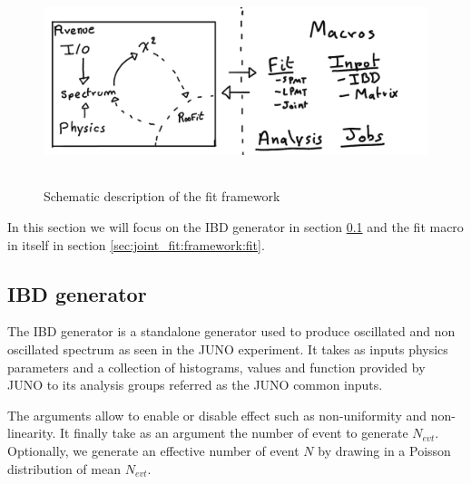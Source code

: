 \documentclass[../main.tex]{subfiles}
\begin{document}
\begin{figure}[ht]
  \centering
  \includegraphics[height=6cm]{images/joint_fit/fit_framework.png}
  \caption{Schematic description of the fit framework}
  \label{fig:joint_fit:framework}
\end{figure}

In this section we will focus on the IBD generator in section \ref{sec:joint_fit:framework:ibd-gen} and the fit macro in itself in section \ref{sec:joint_fit:framework:fit}.
%
%
%
%
\subsection{IBD generator}
\label{sec:joint_fit:framework:ibd-gen}

The IBD generator is a standalone generator used to produce oscillated and non oscillated spectrum as seen in the JUNO experiment. It takes as inputs physics parameters and a collection of histograms, values and function provided by JUNO to its analysis groups referred as the JUNO common inputs.

The arguments allow to enable or disable effect such as non-uniformity and non-linearity. It finally take as an argument the number of event to generate $N_{evt}$. Optionally, we generate an effective number of event $N$ by drawing in a Poisson distribution of mean $N_{evt}$.
\end{document}
